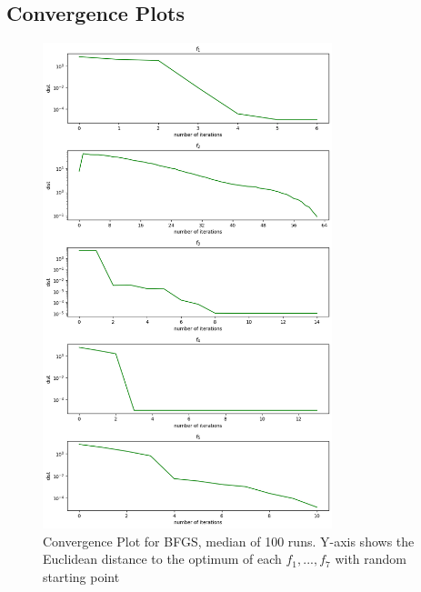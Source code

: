 \documentclass[a4paper]{article}
\begin{document}
\subsection{Convergence Plots}
\label{subsec:label}
\begin{figure}[H]
  \centering
  \includegraphics[width=0.75\textwidth]{plt_dists.png}
  \caption{Convergence Plot for BFGS, median of 100 runs. Y-axis shows the
    Euclidean distance to the optimum of each $f_1,...,f_7$ with random starting point}
  \label{plt1}
\end{figure}
\end{document}

